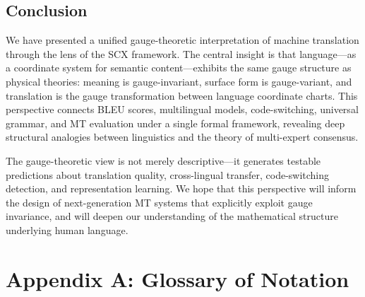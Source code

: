 \documentclass[12pt,a4paper]{article}
\theoremstyle{remark}
\newcommand{\SCX}{\textsf{SCX}}
\begin{document}
\subsection{Conclusion}

We have presented a unified gauge-theoretic interpretation of machine
translation through the lens of the \SCX{} framework. The central
insight is that language---as a coordinate system for semantic
content---exhibits the same gauge structure as physical theories:
meaning is gauge-invariant, surface form is gauge-variant, and
translation is the gauge transformation between language coordinate
charts. This perspective connects BLEU scores, multilingual models,
code-switching, universal grammar, and MT evaluation under a single
formal framework, revealing deep structural analogies between
linguistics and the theory of multi-expert consensus.

The gauge-theoretic view is not merely descriptive---it generates
testable predictions about translation quality, cross-lingual
transfer, code-switching detection, and representation learning.
We hope that this perspective will inform the design of next-generation
MT systems that explicitly exploit gauge invariance, and will
deepen our understanding of the mathematical structure underlying
human language.


\section*{Appendix A: Glossary of Notation}
\label{app:notation}
\end{document}
